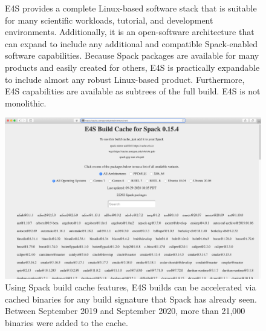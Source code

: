 \begin{figure}
	\centering
	\caption{E4S provides a complete Linux-based software stack that is suitable for many scientific workloads, tutorial, and development environments.  Additionally, it is an open-software architecture that can expand to include any additional and compatible Spack-enabled software capabilities. Because Spack packages are available for many products and easily created for others, E4S is practically expandable to include almost any robust Linux-based product.  Furthermore, E4S capabilities are available as subtrees of the full build. E4S is not monolithic.}
    \protect{}
	\label{fig:e4s-is-isnot}
\end{figure}

\begin{figure}
	\centering
	\includegraphics[width=0.9\linewidth]{E4S-Build-Cache-Binaries-2020}
	\caption{Using Spack build cache features, E4S builds can be accelerated via cached binaries for any build signature that Spack has already seen. Between September 2019 and September 2020, more than 21,000 binaries were added to the cache.}
	\label{fig:e4s-build-cache}
\end{figure}

